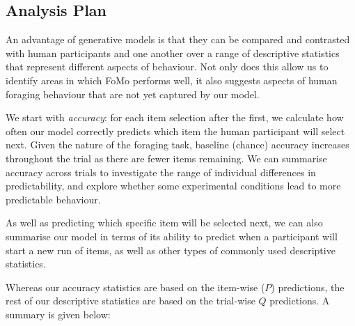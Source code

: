 \documentclass[man, floatsintext]{apa7}
\begin{document}
\subsection{Analysis Plan}

An advantage of generative models is that they can be compared and contrasted with human participants and one another over a range of descriptive statistics that represent different aspects of behaviour. Not only does this allow us to identify areas in which FoMo performs well, it also suggests aspects of human foraging behaviour that are not yet captured by our model.

We start with \textit{accuracy}: for each item selection after the first, we calculate how often our model correctly predicts which item the human participant will select next.  Given the nature of the foraging task, baseline (chance) accuracy increases throughout the trial as there are fewer items remaining. We can summarise accuracy across trials to investigate the range of individual differences in predictability, and explore whether some experimental conditions lead to more predictable behaviour. 

As well as predicting which specific item will be selected next, we can also summarise our model in terms of its ability to predict when a participant will start a new run of items, as well as other types of commonly used descriptive statistics.

Whereas our accuracy statistics are based on the item-wise ($P$) predictions, the rest of our descriptive statistics are based on the trial-wise $Q$ predictions. A summary is given below:
\end{document}
